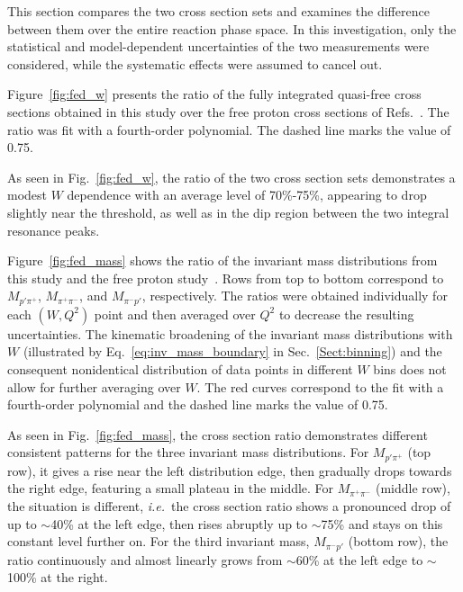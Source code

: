 \documentclass[prc,twocolumn,superscriptaddress,showpacs,amssymb,amsmath,amsfonts,aps,nofootinbib]{revtex4-1}
\begin{document}
This section compares the two cross section sets and examines the difference between them over the entire reaction phase space. In this investigation, only the statistical and model-dependent uncertainties of the two measurements were considered, while the systematic effects were assumed to cancel out.



Figure~\ref{fig:fed_w} presents the ratio of the fully integrated quasi-free cross sections obtained in this study over the free proton cross sections of Refs.\!~\cite{Fed_an_note:2017,Fed_paper_2018}. The ratio was fit with a fourth-order polynomial. The dashed line marks the value of 0.75.  


As seen in Fig.\!~\ref{fig:fed_w}, the ratio of the two cross section sets demonstrates a modest $W$ dependence with an average level of 70\%-75\%, appearing to drop slightly near the threshold, as well as in the dip region between the two integral resonance peaks.


Figure~\ref{fig:fed_mass} shows the ratio of the invariant mass distributions from this study and the free proton study~\cite{Fed_an_note:2017,Fed_paper_2018}. Rows from top to bottom correspond to $M_{p'\pi^{+}}$, $M_{\pi^{+}\pi^{-}}$, and $M_{\pi^{-}p'}$, respectively. The ratios were obtained individually for each $(W,Q^{2})$ point and then averaged over $Q^{2}$ to decrease the resulting uncertainties. The kinematic broadening of the invariant mass distributions with $W$ (illustrated by Eq.\!~\eqref{eq:inv_mass_boundary} in Sec.\!~\ref{Sect:binning}) and the consequent nonidentical distribution of data points in different $W$ bins does not allow for further averaging over $W$. The red curves correspond to the fit with a fourth-order polynomial and the dashed line marks the value of 0.75.  

As seen in Fig.\!~\ref{fig:fed_mass}, the cross section ratio demonstrates different consistent patterns for the three invariant mass distributions. For $M_{p'\pi^{+}}$ (top row), it gives a rise near the left distribution edge, then gradually drops towards the right edge, featuring a small plateau in the middle. For $M_{\pi^{+}\pi^{-}}$ (middle row), the situation is different, {\it i.e.}~the cross section ratio shows a pronounced drop of up to $\sim$40\% at the left edge, then rises abruptly up to $\sim$75\% and stays on this constant level further on. For the third invariant mass, $M_{\pi^{-}p'}$ (bottom row), the ratio continuously and almost linearly grows from $\sim$60\% at the left edge to $\sim$100\% at the right. 
\end{document}
